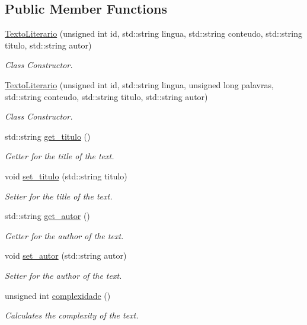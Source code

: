 \subsection*{Public Member Functions}
\begin{DoxyCompactItemize}
\item 
\hyperlink{class_texto_literario_addeb2b30770693455c5395a4a3fb941c}{Texto\-Literario} (unsigned int id, std\-::string lingua, std\-::string conteudo, std\-::string titulo, std\-::string autor)
\begin{DoxyCompactList}\small\item\em Class Constructor. \end{DoxyCompactList}\item 
\hyperlink{class_texto_literario_ac8484056631c263a653243b80065114b}{Texto\-Literario} (unsigned int id, std\-::string lingua, unsigned long palavras, std\-::string conteudo, std\-::string titulo, std\-::string autor)
\begin{DoxyCompactList}\small\item\em Class Constructor. \end{DoxyCompactList}\item 
std\-::string \hyperlink{class_texto_literario_adca504c785afdb9e77542b2bdca90a37}{get\-\_\-titulo} ()
\begin{DoxyCompactList}\small\item\em Getter for the title of the text. \end{DoxyCompactList}\item 
void \hyperlink{class_texto_literario_acfb7945b3d45250c316a3b6dc688383c}{set\-\_\-titulo} (std\-::string titulo)
\begin{DoxyCompactList}\small\item\em Setter for the title of the text. \end{DoxyCompactList}\item 
std\-::string \hyperlink{class_texto_literario_acb31c6be6750cea439dde8636bf960ff}{get\-\_\-autor} ()
\begin{DoxyCompactList}\small\item\em Getter for the author of the text. \end{DoxyCompactList}\item 
void \hyperlink{class_texto_literario_a859bcc3c015ebcced7b4691990d3ec2a}{set\-\_\-autor} (std\-::string autor)
\begin{DoxyCompactList}\small\item\em Setter for the author of the text. \end{DoxyCompactList}\item 
unsigned int \hyperlink{class_texto_literario_a286c1693b71a45d4d577dcd15871892c}{complexidade} ()
\begin{DoxyCompactList}\small\item\em Calculates the complexity of the text. \end{DoxyCompactList}\end{DoxyCompactItemize}
